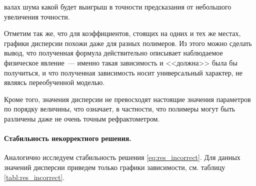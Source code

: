 \documentclass[12pt,a4paper]{article}
\theoremstyle{definition}
\begin{document}
валах шума какой будет выигрыш в точности
предсказания от небольшого увеличения точности.

Отметим так же, что для коэффициентов, стоящих на одних и тех же местах, графики дисперсии
похожи даже для разных полимеров. Из этого можно сделать вывод, что полученная формула
действительно описывает наблюдаемое физическое явление~--- именно такая зависимость и
<<должна>> была бы получиться, и что полученная зависимость носит универсальный характер,
не являясь переобученной моделью.

Кроме того, значения дисперсии не превосходят настоящие значения параметров по порядку величины,
что означает, в частности, что полимеры могут быть различены даже не очень точным рефрактометром.

\paragraph{Стабильность некорректного решения.}

Аналогично исследуем стабильность решения \eqref{eq:res_incorrect}. Для данных значений дисперсии
приведем только графики зависимости, см. таблицу \ref{tabl:res_incorrect}.
\end{document}
